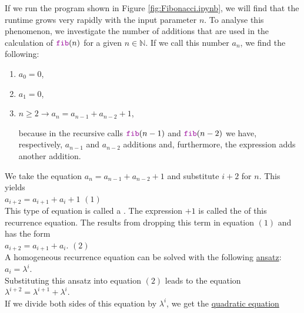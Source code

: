 If we run the program shown in Figure \ref{fig:Fibonacci.ipynb}, we will find that the runtime grows very rapidly with
the input parameter $n$.  To analyse this phenomenon, we investigate the number of additions that are used in the
calculation of $\mytt{fib}(n)$ for a given $n \in \mathbb{N}$.  If we call this number $a_n$, we find
the following:
\begin{enumerate}
\item $a_0 = 0$,
\item $a_1 = 0$,
\item $n \geq 2 \rightarrow a_n = a_{n-1} + a_{n-2} + 1$,

      because in the recursive calls $\mytt{fib}(n-1)$ and $\mytt{fib}(n-2)$ we have, respectively, 
      $a_{n-1}$ and $a_{n-2}$ additions and, furthermore, the expression
       adds another addition.
\end{enumerate}
We take the equation $a_n = a_{n-1} + a_{n-2} + 1$ and substitute $i+2$ for $n$.  This yields
\\[0.2cm]
\hspace*{1.3cm} $a_{i+2} = a_{i+1} + a_i + 1$ \hspace*{\fill} $(1)$
\\[0.2cm]
This type of equation is called a .  The expression $+ 1$ is
called the  of this recurrence equation.
The  
results from dropping this term in equation $(1)$ and has the form
\\[0.2cm]
\hspace*{1.3cm}
$a_{i+2} = a_{i+1} + a_i$. \hspace*{\fill} $(2)$
\\[0.2cm]
A homogeneous recurrence equation can be solved with the following
\href{https://en.wikipedia.org/wiki/Ansatz}{ansatz}:
\\[0.2cm]
\hspace*{1.3cm} $a_i = \lambda^i$. \\[0.2cm]
Substituting this ansatz into equation $(2)$ leads to the equation 
\\[0.2cm]
\hspace*{1.3cm}
$\lambda^{i+2} = \lambda^{i+1} + \lambda^i$.
\\[0.2cm]
If we divide both sides of this equation by $\lambda^i$, we get the
\href{https://en.wikipedia.org/wiki/Quadratic_equation}{quadratic equation}
